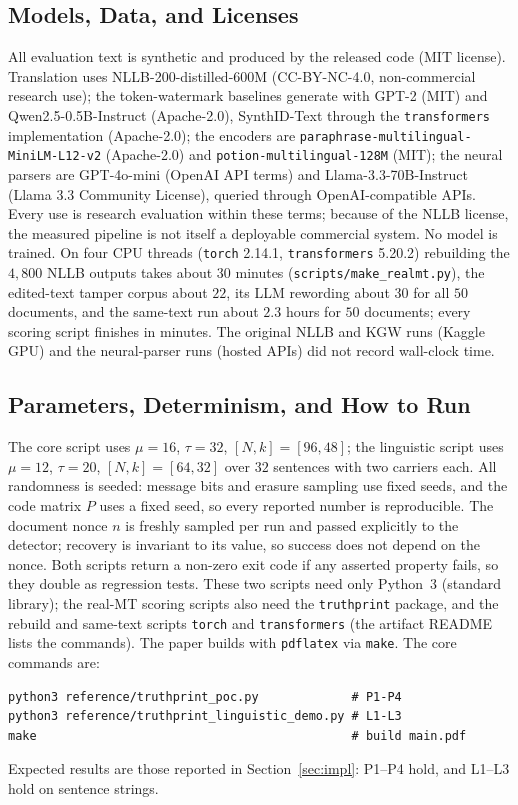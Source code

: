 \documentclass[11pt]{article}
\begin{document}
\subsection{Models, Data, and Licenses}
All evaluation text is synthetic and produced by the released code (MIT license). Translation uses NLLB-200-distilled-600M \cite{nllb2024} (CC-BY-NC-4.0, non-commercial research use); the token-watermark baselines generate with GPT-2 (MIT) and Qwen2.5-0.5B-Instruct (Apache-2.0), SynthID-Text through the \texttt{transformers} implementation (Apache-2.0); the encoders are \texttt{paraphrase-multilingual-MiniLM-L12-v2} (Apache-2.0) and \texttt{potion-multilingual-128M} (MIT); the neural parsers are GPT-4o-mini (OpenAI API terms) and Llama-3.3-70B-Instruct (Llama 3.3 Community License), queried through OpenAI-compatible APIs. Every use is research evaluation within these terms; because of the NLLB license, the measured pipeline is not itself a deployable commercial system. No model is trained. On four CPU threads (\texttt{torch} 2.14.1, \texttt{transformers} 5.20.2) rebuilding the $4{,}800$ NLLB outputs takes about $30$ minutes (\texttt{scripts/\allowbreak make\_realmt.py}), the edited-text tamper corpus about $22$, its LLM rewording about $30$ for all $50$ documents, and the same-text run about $2.3$ hours for $50$ documents; every scoring script finishes in minutes. The original NLLB and KGW runs (Kaggle GPU) and the neural-parser runs (hosted APIs) did not record wall-clock time.

\subsection{Parameters, Determinism, and How to Run}
The core script uses $\mu=16$, $\tau=32$, $[N,k]=[96,48]$; the linguistic script uses $\mu=12$, $\tau=20$, $[N,k]=[64,32]$ over $32$ sentences with two carriers each. All randomness is seeded: message bits and erasure sampling use fixed seeds, and the code matrix $P$ uses a fixed seed, so every reported number is reproducible. The document nonce $n$ is freshly sampled per run and passed explicitly to the detector; recovery is invariant to its value, so success does not depend on the nonce. Both scripts return a non-zero exit code if any asserted property fails, so they double as regression tests. These two scripts need only Python~3 (standard library); the real-MT scoring scripts also need the \texttt{truthprint} package, and the rebuild and same-text scripts \texttt{torch} and \texttt{transformers} (the artifact README lists the commands). The paper builds with \texttt{pdflatex} via \texttt{make}. The core commands are:
\begin{lstlisting}
python3 reference/truthprint_poc.py             # P1-P4
python3 reference/truthprint_linguistic_demo.py # L1-L3
make                                            # build main.pdf
\end{lstlisting}
Expected results are those reported in Section~\ref{sec:impl}: P1--P4 hold, and L1--L3 hold on sentence strings.
\end{document}
